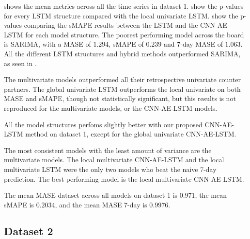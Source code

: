  shows the mean metrics across
all the time series in dataset 1.
 show the p-values
for every LSTM structure compared with the local univariate LSTM.
 show the p-values
comparing the sMAPE results between the LSTM and the CNN-AE-LSTM for each
model structure.
The poorest performing model across the board
is SARIMA, with a MASE of $1.294$, sMAPE of $0.239$ and 7-day MASE of $1.063$.
All the different LSTM structures and hybrid methods outperformed SARIMA,
as seen in .

The multivariate models outperformed all their retrospective univariate counter partners.
The global univariate LSTM outperforms the local univariate on both MASE and sMAPE, though not statistically significant,
but this results is not reproduced for the multivariate models, or the CNN-AE-LSTM models.

All the model structures perfoms slightly better with our proposed CNN-AE-LSTM method on dataset 1, except for
the global univariate CNN-AE-LSTM.

The most consistent models with the least amount of variance are the multivariate models.
The local multivariate CNN-AE-LSTM and the local multivariate LSTM were the only two models
who beat the naive 7-day prediction. The best performing model is the local multivariate CNN-AE-LSTM.

The mean MASE dataset across all models on dataset 1 is $0.971$,
the mean sMAPE is $0.2034$,
and the mean MASE 7-day is $0.9976$.


\subsection{Dataset 2}


